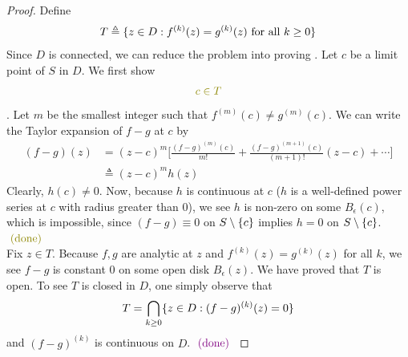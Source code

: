 \documentclass{report}
\begin{document}
\begin{proof}
Define 
\begin{align*}
T \triangleq \{ z\in D:f^{(k)}(z)=g^{(k)}(z)\text{ for all }k\geq 0 \}
\end{align*}
Since $D$ is connected, we can reduce the problem into proving  . Let $c$ be a limit point of $S$ in $D$. We first show 
\begin{align*}
\olive{c \in T}
\end{align*}
. Let $m$ be the smallest integer such that  $f^{(m)}(c)\neq g^{(m)}(c)$. We can write the Taylor expansion of $f-g$ at  $c$ by 
 \begin{align*}
   (f-g)(z)&= (z-c)^{m} \Big[ \frac{(f-g)^{(m)}(c)}{m!} + \frac{(f-g)^{(m+1)}(c)}{(m+1)!}(z-c)+\cdots  \Big] \\
   &\triangleq (z-c)^m h(z)
\end{align*}
Clearly, $h(c)\neq 0$. Now, because $h$ is continuous at $c$  ($h$ is a well-defined power series at  $c$ with radius greater than $0$), we see $h$ is non-zero on some  $B_{\epsilon }(c)$, which is impossible, since $(f-g)\equiv 0$ on $S\setminus \{ c \}$ implies  $h=0$ on $S\setminus \{ c \}$.  \CaC $\odone$\\

Fix $z \in T$. Because $f,g$ are analytic at $z$ and  $f^{(k)}(z)=g^{(k)}(z)$ for all $k$, we see $f-g$ is constant $0$ on some open disk $B_\epsilon (z)$. We have proved that $T$ is open. To see $T$ is closed in  $D$, one simply observe that 
\begin{align*}
T= \bigcap_{k\geq 0} \{ z \in D:(f-g)^{(k)}(z)=0 \}
\end{align*}
and $(f-g)^{(k)}$ is continuous on $D$. $\textcolor{violet}{\text{ (done) }}$
\end{proof}
\end{document}
